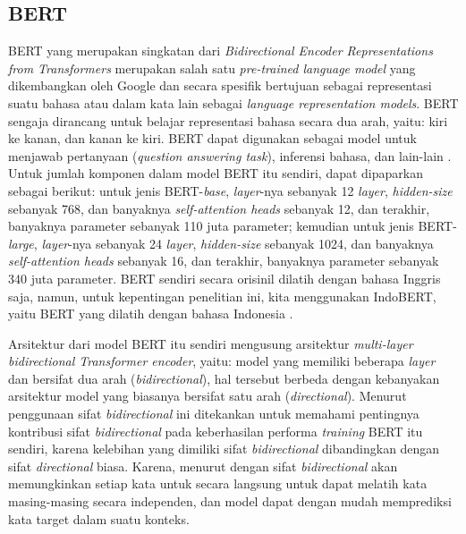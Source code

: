 \subsection{BERT}

BERT yang merupakan singkatan dari \emph{Bidirectional Encoder Representations from Transformers} merupakan salah satu \emph{pre-trained language model} yang dikembangkan oleh Google dan secara spesifik bertujuan sebagai representasi suatu bahasa atau dalam kata lain sebagai \emph{language representation models}. BERT sengaja dirancang untuk belajar representasi bahasa secara dua arah, yaitu: kiri ke kanan, dan kanan ke kiri. BERT dapat digunakan sebagai model untuk menjawab pertanyaan (\emph{question answering task}), inferensi bahasa, dan lain-lain \citep{devlin-etal-2019-bert}. Untuk jumlah komponen dalam model BERT itu sendiri, dapat dipaparkan sebagai berikut: untuk jenis BERT-\emph{base}, \emph{layer}-nya sebanyak 12 \emph{layer}, \emph{hidden-size} sebanyak 768, dan banyaknya \emph{self-attention heads} sebanyak 12, dan terakhir, banyaknya parameter sebanyak 110 juta parameter; kemudian untuk jenis BERT-\emph{large}, \emph{layer}-nya sebanyak 24 \emph{layer}, \emph{hidden-size} sebanyak 1024, dan banyaknya \emph{self-attention heads} sebanyak 16, dan terakhir, banyaknya parameter sebanyak 340 juta parameter. BERT sendiri secara orisinil dilatih dengan bahasa Inggris saja, namun, untuk kepentingan penelitian ini, kita menggunakan IndoBERT, yaitu BERT yang dilatih dengan bahasa Indonesia \citep{koto2020indolem}.

Arsitektur dari model BERT itu sendiri mengusung arsitektur \emph{multi-layer bidirectional Transformer encoder}, yaitu: model yang memiliki beberapa \emph{layer} dan bersifat dua arah (\emph{bidirectional}), hal tersebut berbeda dengan kebanyakan arsitektur model yang biasanya bersifat satu arah (\emph{directional}). Menurut 
\citet{devlin-etal-2019-bert} penggunaan sifat \emph{bidirectional} ini ditekankan untuk memahami pentingnya kontribusi sifat \emph{bidirectional} pada keberhasilan performa \emph{training} BERT itu sendiri, karena kelebihan yang dimiliki sifat \emph{bidirectional} dibandingkan dengan sifat \emph{directional} biasa. Karena, menurut \citet{devlin-etal-2019-bert} dengan sifat \emph{bidirectional} akan memungkinkan setiap kata untuk secara langsung untuk dapat melatih kata masing-masing secara independen, dan model dapat dengan mudah memprediksi kata target dalam suatu konteks.

